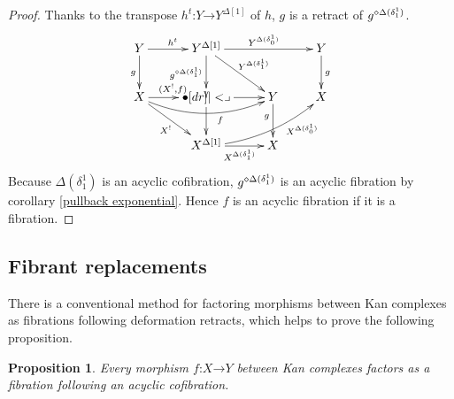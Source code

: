 \documentclass{amsart}
\theoremstyle{plain}
\newtheorem{prop}[theorem]{Proposition}
\theoremstyle{definition}
\newcommand\bang{!}
\newcommand\of{\mathord:}
\renewcommand\to{\mathord\rightarrow}
\newcommand\simplex\Delta
\begin{document}
\begin{proof}
Thanks to the transpose $h^t\of Y\to Y^{\simplex[1]}$ of $h$, $g$ is a retract of $g\pe{\simplex(\delta^1_1)}$.
\[\xymatrix{
Y\ar[d]_g \ar[r]^{h^t} & Y^{\simplex[1]} \ar[d]_{g\pe{\Delta(\delta^1_1)}} \ar[dr]^{Y^{\Delta(\delta^1_1)}} \ar[rr]^{Y^{\Delta(\delta^1_0)}}&& Y \ar[d]^g\\
X \ar[r]^{(X^\bang,f)} \ar[dr]_{X^\bang} \ar@/_3ex/[rr]_(.6)f & \bullet\ar[r]\ar[d]\pb & Y \ar[d]_(.4)g & X \\
& X^{\simplex[1]} \ar[r]_{X^{\Delta(\delta_1^1)}} \ar@/_2ex/[urr]_(.7){X^{\Delta(\delta^1_0)}}& X
}\]
Because $\simplex(\delta^1_1)$ is an acyclic cofibration, $g\pe{\simplex(\delta^1_1)}$ is an acyclic fibration by corollary \ref{pullback exponential}. Hence $f$ is an acyclic fibration if it is a fibration.
\end{proof}

\subsection{Fibrant replacements}
There is a conventional method for factoring morphisms between Kan complexes as fibrations following deformation retracts, which helps to prove the following proposition.

\begin{prop} Every morphism $f\of X\to Y$ between Kan complexes factors as a fibration following an acyclic cofibration. \label{factor2} \end{prop}
\end{document}
